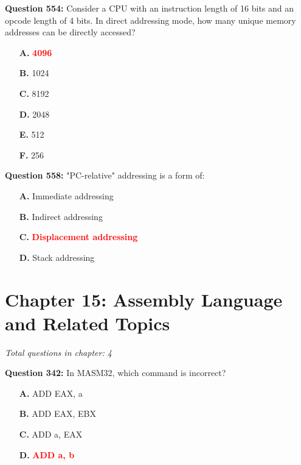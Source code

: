 \documentclass[12pt,a4paper]{article}
\begin{document}
\vspace{0.5cm}

\vspace{0.5cm}



\textbf{Question 554:} Consider a CPU with an instruction length of 16 bits and an opcode length of 4 bits. In direct addressing mode, how many unique memory addresses can be directly accessed?

\begin{itemize}
    \item[\textbf{A.}] \textcolor{red}{\textbf{4096}}
    \item[\textbf{B.}] 1024
    \item[\textbf{C.}] 8192
    \item[\textbf{D.}] 2048
    \item[\textbf{E.}] 512
    \item[\textbf{F.}] 256
\end{itemize}

\textbf{Question 558:} "PC-relative" addressing is a form of:

\begin{itemize}
    \item[\textbf{A.}] Immediate addressing
    \item[\textbf{B.}] Indirect addressing
    \item[\textbf{C.}] \textcolor{red}{\textbf{Displacement addressing}}
    \item[\textbf{D.}] Stack addressing
\end{itemize}

\section{Chapter 15: Assembly Language and Related Topics}
\textit{Total questions in chapter: 4}

\textbf{Question 342:} In MASM32, which command is incorrect?

\begin{itemize}
    \item[\textbf{A.}] ADD EAX, a
    \item[\textbf{B.}] ADD EAX, EBX
    \item[\textbf{C.}] ADD a, EAX
    \item[\textbf{D.}] \textcolor{red}{\textbf{ADD a, b}}
\end{itemize}

\vspace{0.5cm}
\end{document}
